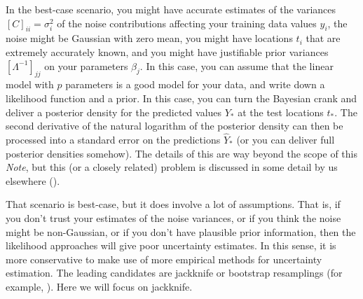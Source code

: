 \documentclass[12pt,letterpaper]{article}
\newcommand{\documentname}{\textsl{Note}}
\begin{document}
In the best-case scenario, you might have accurate estimates of the variances $[C]_{ii} = \sigma_i^2$ of the noise contributions affecting your training data values $y_i$, the noise might be Gaussian with zero mean, you might have locations $t_i$ that are extremely accurately known, and you might have justifiable prior variances $[\Lambda^{-1}]_{jj}$ on your parameters $\beta_j$.
In this case, you can assume that the linear model with $p$ parameters is a good model for your data, and write down a likelihood function and a prior.
In this case, you can turn the Bayesian crank and deliver a posterior density for the predicted values $Y_\ast$ at the test locations $t_\ast$.
The second derivative of the natural logarithm of the posterior density can then be processed into a standard error on the predictions $\hat{Y}_\ast$ (or you can deliver full posterior densities somehow).
The details of this are way beyond the scope of this \documentname, but this (or a closely related) problem is discussed in some detail by us elsewhere (\citealt{products}).

That scenario is best-case, but it does involve a lot of assumptions.
That is, if you don't trust your estimates of the noise variances, or if you think the noise might be non-Gaussian, or if you don't have plausible prior information, then the likelihood approaches will give poor uncertainty estimates.
In this sense, it is more conservative to make use of more empirical methods for uncertainty estimation.
The leading candidates are jackknife or bootstrap resamplings (for example, \citealt{bootjack}).
Here we will focus on jackknife.
\end{document}
